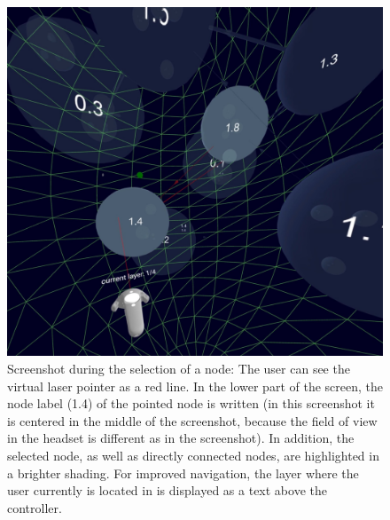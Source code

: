 \begin{figure}[h]
    \centering
    \includegraphics[width=1\textwidth]{graphics/screenShotFilteringNodes2.jpg}
    \caption[Screenshot during the selection of a node.]{Screenshot during the selection of a node: The user can see the virtual laser pointer as a red line. 
    In the lower part of the screen, the node label (1.4) of the pointed node is written (in this screenshot it is centered in the middle of the screenshot, because the field of view in the headset is different as in the screenshot).
    In addition, the selected node, as well as directly connected nodes, are highlighted in a brighter shading. For improved navigation, the layer where the user currently is located in is displayed as a text above the controller.} 
    \label{fig:screenshot_interaction} 
\end{figure}


